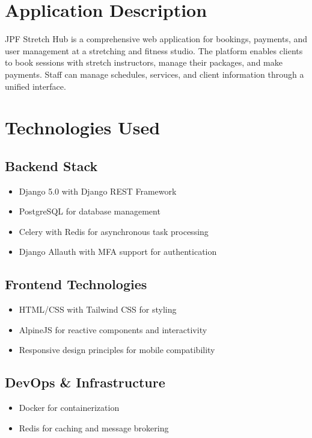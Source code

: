 \documentclass[11pt,a4paper]{report}
\begin{document}
\section{Application Description}

JPF Stretch Hub is a comprehensive web application for bookings, payments, and user management at a stretching and fitness studio. The platform enables clients to book sessions with stretch instructors, manage their packages, and make payments. Staff can manage schedules, services, and client information through a unified interface.

\section{Technologies Used}

\subsection{Backend Stack}
\begin{tcolorbox}[
    enhanced,
    colback=light,
    colframe=primary,
    arc=0mm
]
\begin{itemize}
    \item Django 5.0 with Django REST Framework
    \item PostgreSQL for database management
    \item Celery with Redis for asynchronous task processing
    \item Django Allauth with MFA support for authentication
\end{itemize}
\end{tcolorbox}

\subsection{Frontend Technologies}
\begin{tcolorbox}[
    enhanced,
    colback=light,
    colframe=primary,
    arc=0mm
]
\begin{itemize}
    \item HTML/CSS with Tailwind CSS for styling
    \item AlpineJS for reactive components and interactivity
    \item Responsive design principles for mobile compatibility
\end{itemize}
\end{tcolorbox}

\subsection{DevOps \& Infrastructure}
\begin{tcolorbox}[
    enhanced,
    colback=light,
    colframe=primary,
    arc=0mm
]
\begin{itemize}
    \item Docker for containerization
    \item Redis for caching and message brokering
\end{itemize}
\end{tcolorbox}
\end{document}
